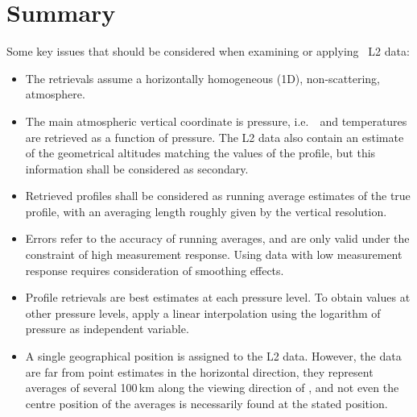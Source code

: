 \chapter{Summary}
\label{chapter:summary}


\noindent
Some key issues that should be considered when examining or applying \smr\
L2 data:
\begin{itemize}
\item The retrievals assume a horizontally homogeneous (1D), non-scattering,
  atmosphere.
\item The main atmospheric vertical coordinate is pressure, i.e.\ \VMR\ and
  temperatures are retrieved as a function of pressure. The L2 data also
  contain an estimate of the geometrical altitudes
  matching the values of the profile, but this information shall be considered as
  secondary.
\item Retrieved profiles shall be considered as running average estimates of
  the true profile, with an averaging length roughly given by the vertical
  resolution.
\item Errors refer to the accuracy of running averages, and are only valid under
  the constraint of high measurement response. Using data with low measurement
  response requires consideration of smoothing effects.
\item Profile retrievals are best estimates at each pressure level. To obtain
  values at other pressure levels, apply a linear interpolation using the
  logarithm of pressure as independent variable.
\item A single geographical position is assigned to the L2 data. However, the
  data are far from point estimates in the horizontal direction, they represent
  averages of several 100\,km along the viewing direction of \smr, and not even
  the centre position of the averages is necessarily found at the stated
  position.
\end{itemize}



